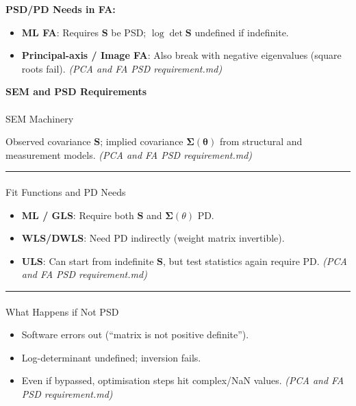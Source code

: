 \documentclass[
  12pt,
]{article}
\makeatletter
\let\oldparagraph\paragraph
\renewcommand{\paragraph}{
    \@ifstar
      \xxxParagraphStar
      \xxxParagraphNoStar
  }
\newcommand{\xxxParagraphStar}[1]{\oldparagraph*{#1}\mbox{}}
\newcommand{\xxxParagraphNoStar}[1]{\oldparagraph{#1}\mbox{}}
\providecommand{\tightlist}{%
  \setlength{\itemsep}{0pt}\setlength{\parskip}{0pt}}
\theoremstyle{plain}
\theoremstyle{definition}
\theoremstyle{remark}
\makeatother
\begin{document}
\textbf{PSD/PD Needs in FA:}

\begin{itemize}
\tightlist
\item
  \textbf{ML FA}: Requires \(\mathbf{S}\) be PSD;
  \(\log \det \mathbf{S}\) undefined if indefinite.
\item
  \textbf{Principal-axis / Image FA}: Also break with negative
  eigenvalues (square roots fail). \emph{(PCA and FA PSD
  requirement.md)}
\end{itemize}

\textbf{SEM and PSD Requirements}

\paragraph{SEM Machinery}\label{sem-machinery}

Observed covariance \(\mathbf{S}\); implied covariance
\(\boldsymbol\Sigma(\boldsymbol\theta)\) from structural and measurement
models. \emph{(PCA and FA PSD requirement.md)}

\begin{center}\rule{0.5\linewidth}{0.5pt}\end{center}

\paragraph{Fit Functions and PD Needs}\label{fit-functions-and-pd-needs}

\begin{itemize}
\tightlist
\item
  \textbf{ML / GLS}: Require both \(\mathbf{S}\) and
  \(\boldsymbol\Sigma(\theta)\) PD.
\item
  \textbf{WLS/DWLS}: Need PD indirectly (weight matrix invertible).
\item
  \textbf{ULS}: Can start from indefinite \(\mathbf{S}\), but test
  statistics again require PD. \emph{(PCA and FA PSD requirement.md)}
\end{itemize}

\begin{center}\rule{0.5\linewidth}{0.5pt}\end{center}

\paragraph{What Happens if Not PSD}\label{what-happens-if-not-psd}

\begin{itemize}
\tightlist
\item
  Software errors out (``matrix is not positive definite'').
\item
  Log-determinant undefined; inversion fails.
\item
  Even if bypassed, optimisation steps hit complex/NaN values.
  \emph{(PCA and FA PSD requirement.md)}
\end{itemize}
\end{document}
